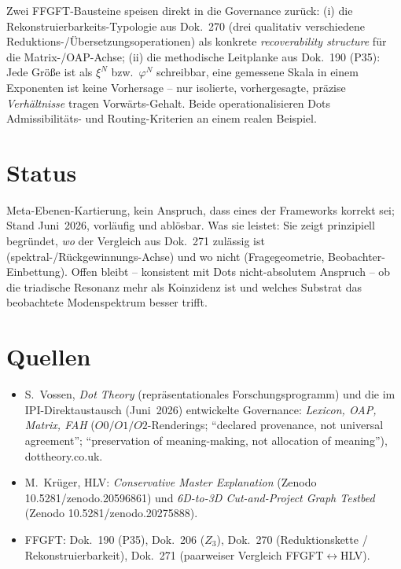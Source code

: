 Zwei FFGFT-Bausteine speisen direkt in die Governance zurück: (i) die Rekonstruierbarkeits-Typologie aus
Dok.~270 (drei qualitativ verschiedene Reduktions-/Übersetzungsoperationen) als konkrete \emph{recoverability
structure} für die Matrix-/OAP-Achse; (ii) die methodische Leitplanke aus Dok.~190 (P35): Jede Größe ist als
$\xi^{N}$ bzw.\ $\varphi^{N}$ schreibbar, eine gemessene Skala in einem Exponenten ist keine Vorhersage --
nur isolierte, vorhergesagte, präzise \emph{Verhältnisse} tragen Vorwärts-Gehalt. Beide operationalisieren
Dots Admissibilitäts- und Routing-Kriterien an einem realen Beispiel.

\section{Status}

Meta-Ebenen-Kartierung, kein Anspruch, dass eines der Frameworks korrekt sei; Stand Juni~2026, vorläufig und
ablösbar. Was sie leistet: Sie zeigt prinzipiell begründet, \emph{wo} der Vergleich aus Dok.~271 zulässig ist
(spektral-/Rückgewinnungs-Achse) und wo nicht (Fragegeometrie, Beobachter-Einbettung). Offen bleibt -- konsistent
mit Dots nicht-absolutem Anspruch -- ob die triadische Resonanz mehr als Koinzidenz ist und welches Substrat das
beobachtete Modenspektrum besser trifft.

\section{Quellen}

\begin{itemize}
\item S.~Vossen, \emph{Dot Theory} (repräsentationales Forschungsprogramm) und die im IPI-Direktaustausch
(Juni~2026) entwickelte Governance: \emph{Lexicon, OAP, Matrix, FAH} ($O0/O1/O2$-Renderings; \enquote{declared
provenance, not universal agreement}; \enquote{preservation of meaning-making, not allocation of meaning}),
dottheory.co.uk.
\item M.~Krüger, HLV: \emph{Conservative Master Explanation} (Zenodo 10.5281/zenodo.20596861) und
\emph{6D-to-3D Cut-and-Project Graph Testbed} (Zenodo 10.5281/zenodo.20275888).
\item FFGFT: Dok.~190 (P35), Dok.~206 ($Z_3$), Dok.~270 (Reduktionskette / Rekonstruierbarkeit),
Dok.~271 (paarweiser Vergleich FFGFT$\leftrightarrow$HLV).
\end{itemize}
